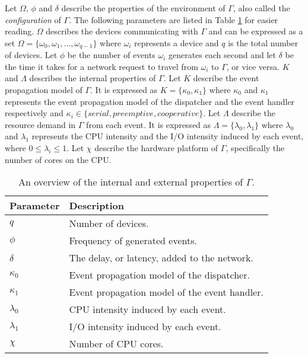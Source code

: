 Let $\Omega$, $\phi$ and $\delta$ describe the properties of the environment of
$\Gamma$, also called the \textit{configuration} of $\Gamma$. The following
parameters are listed in Table \ref{tab:gateway_config} for easier reading.
$\Omega$ describes the devices communicating with $\Gamma$ and can be expressed
as a set $\Omega = \{ \omega_0, \omega_1, ..., \omega_{q-1} \}$ where
$\omega_i$ represents a device and $q$ is the total number of devices. Let
$\phi$ be the number of events $\omega_i$ generates each second and let
$\delta$ be the time it takes for a network request to travel from $\omega_i$
to $\Gamma$, or vice versa. $K$ and $\Lambda$ describes the internal properties
of $\Gamma$. Let $K$ describe the event propagation model of $\Gamma$. It is
expressed as $K = \{ \kappa_0, \kappa_1 \}$ where $\kappa_0$ and $\kappa_1$
represents the event propagation model of the dispatcher and the event handler
respectively and $\kappa_i \in \{ \textit{serial}, \textit{preemptive},
\textit{cooperative} \}$. Let $\Lambda$ describe the resource demand in
$\Gamma$ from each event. It is expressed as $\Lambda = \{ \lambda_0, \lambda_1
\}$ where $\lambda_0$ and $\lambda_1$ represents the CPU intensity and the I/O
intensity induced by each event, where $0 \leq \lambda_i \leq 1$. Let $\chi$
describe the hardware platform of $\Gamma$, specifically the number of cores on
the CPU.

\begin{table}[h!]
    \caption{An overview of the internal and external properties of $\Gamma$.}
    \label{tab:gateway_config}

    \begin{center}
        \begin{tabular}{|l|l|}
            \hline
            Parameter   & Description \\
            \hline
            $q$         & Number of devices. \\
            $\phi$      & Frequency of generated events. \\
            $\delta$    & The delay, or latency, added to the network. \\
            $\kappa_0$  & Event propagation model of the dispatcher. \\
            $\kappa_1$  & Event propagation model of the event handler. \\
            $\lambda_0$ & CPU intensity induced by each event. \\
            $\lambda_1$ & I/O intensity induced by each event. \\
            $\chi$      & Number of CPU cores. \\
            \hline
        \end{tabular}
    \end{center}
\end{table}

